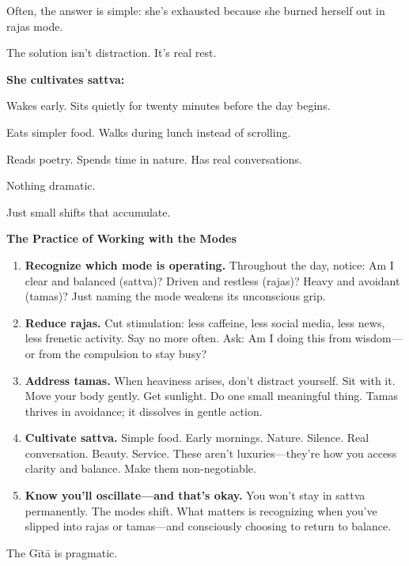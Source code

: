 \documentclass[11pt,twoside]{book}
\begin{document}
Often, the answer is simple: she's exhausted because she burned herself out in rajas mode.

The solution isn't distraction. It's real rest.

\textbf{\textbf{She cultivates sattva:}}

Wakes early. Sits quietly for twenty minutes before the day begins.

Eats simpler food. Walks during lunch instead of scrolling.

Reads poetry. Spends time in nature. Has real conversations.

Nothing dramatic.

Just small shifts that accumulate.

\begin{practicebox}
\textbf{The Practice of Working with the Modes}

\begin{enumerate}
\item \textbf{Recognize which mode is operating.} Throughout the day, notice: Am I clear and balanced (sattva)? Driven and restless (rajas)? Heavy and avoidant (tamas)? Just naming the mode weakens its unconscious grip.

\item \textbf{Reduce rajas.} Cut stimulation: less caffeine, less social media, less news, less frenetic activity. Say no more often. Ask: Am I doing this from wisdom—or from the compulsion to stay busy?

\item \textbf{Address tamas.} When heaviness arises, don't distract yourself. Sit with it. Move your body gently. Get sunlight. Do one small meaningful thing. Tamas thrives in avoidance; it dissolves in gentle action.

\item \textbf{Cultivate sattva.} Simple food. Early mornings. Nature. Silence. Real conversation. Beauty. Service. These aren't luxuries—they're how you access clarity and balance. Make them non-negotiable.

\item \textbf{Know you'll oscillate—and that's okay.} You won't stay in sattva permanently. The modes shift. What matters is recognizing when you've slipped into rajas or tamas—and consciously choosing to return to balance.
\end{enumerate}
\end{practicebox}

The Gītā is pragmatic.
\end{document}
